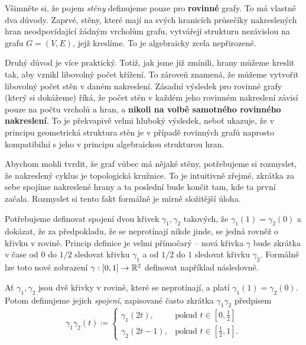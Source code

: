 \begin{remark}
 Všimněte si, že pojem \emph{stěny} definujeme pouze pro \textbf{rovinné} grafy.
 To má vlastně dva důvody. Zaprvé, stěny, které mají na svých hranicích
 průsečíky nakreslených hran neodpovídající žádným vrcholům grafu, vytvářejí
 strukturu nezávislou na grafu $G = (V,E)$, jejž kreslíme. To je algebraicky
 zcela nepřirozené.

 Druhý důvod je více praktický. Totiž, jak jsme již zmínili, hrany můžeme
 kreslit tak, aby vznikl libovolný počet křížení. To zároveň znamená, že můžeme
 vytvořit libovolný počet stěn v daném nakreslení. Zásadní výsledek pro rovinné
 grafy (který si dokážeme) říká, že počet stěn v každém jeho rovinném nakreslení
 závisí pouze na počtu vrcholů a hran, a \textbf{nikoli na volbě samotného
 rovinného nakreslení}. To je překvapivě velmi hluboký výsledek, neboť ukazuje,
 že v principu geometrická struktura stěn je v případě rovinných grafů naprosto
 kompatibilní s jeho v principu algebraickou strukturou hran.
\end{remark}

Abychom mohli tvrdit, že graf vůbec má nějaké stěny, potřebujeme si rozmyslet,
že nakreslený cyklus je topologická kružnice. To je intuitivně zřejmé, zkrátka
za sebe spojíme nakreslené hrany a ta poslední bude končit tam, kde ta první
začala. Rozmyslet si tento fakt formálně je mírně složitější úloha.

Potřebujeme definovat spojení dvou křivek $\gamma_1,\gamma_2$ takových, že
$\gamma_1(1) = \gamma_2(0)$ a dokázat, že za předpokladu, že se neprotínají
nikde jinde, se jedná rovněž o křivku v rovině. Princip definice je velmi
přímočarý -- nová křivka $\gamma$ bude zkrátka v čase od $0$ do $1 / 2$ sledovat
křivku $\gamma_1$ a od $1 / 2$ do $1$ sledovat křivku $\gamma_2$. Formálně lze
toto nové zobrazení $\gamma:[0,1] \to \mathbb{R}^2$ definovat například následovně.

\begin{definition}
 \label{def:spojeni-krivek}
 Ať $\gamma_1,\gamma_2$ jsou dvě křivky v rovině, které se neprotínají, a platí
 $\gamma_1(1) = \gamma_2(0)$. Potom definujeme jejich \emph{spojení}, zapisované
 často zkrátka $\gamma_1\gamma_2$ předpisem
 \[
  \gamma_1\gamma_2(t) \coloneqq
  \begin{cases}
   \gamma_1(2t), &\text{pokud } t \in [0,\frac{1}{2}]\\
   \gamma_2(2t - 1), &\text{pokud } t \in [\frac{1}{2},1].
  \end{cases}
 \]
\end{definition}

